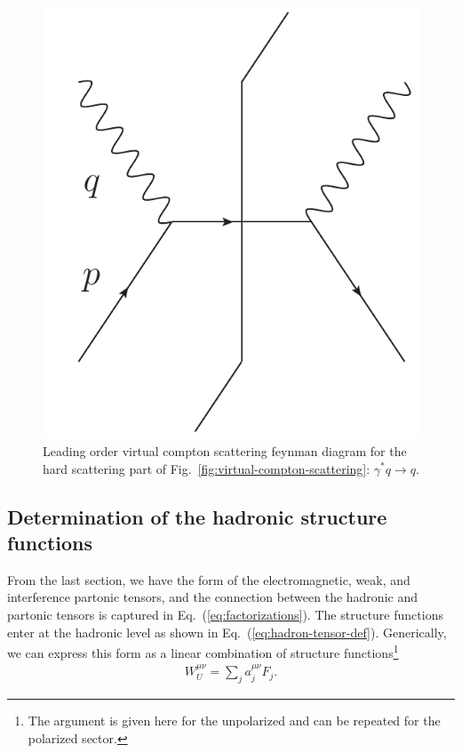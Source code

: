 \documentclass[aps,prd,amsmath,superscriptaddress,floatfix,nofootinbib]{revtex4-2}
\newcommand{\eref}[1]{Eq.~(\ref{eq:#1})}
\newcommand{\fref}[1]{Fig.~\ref{fig:#1}}
\begin{document}
\begin{figure}[h!tb]
\begin{center} 
    \includegraphics[width=0.2\paperwidth]{DIS_LO.pdf}
    \caption{Leading order virtual compton scattering feynman diagram for the hard scattering part of \fref{virtual-compton-scattering}: $\gamma^{*}q \rightarrow q$.}
    \label{fig:virtual-compton-scattering-LO}
\end{center}
\end{figure}


\subsection{Determination of the hadronic structure functions}
\label{ss:determination-of-the-hadronic-structure-functions}

From the last section, we have the form of the electromagnetic, weak, and interference partonic tensors, and the connection between the hadronic and partonic tensors is captured in \eref{factorizations}.
The structure functions enter at the hadronic level as shown in \eref{hadron-tensor-def}.
Generically, we can express this form as a linear combination of structure functions\footnote{The argument is given here for the unpolarized and can be repeated for the polarized sector.}
\begin{eqnarray}
    \label{eq:hadronic-tensor-generic}
    W^{\mu\nu}_{U} = \sum_{j} a_{j}^{\mu\nu} F_{j}
.\end{eqnarray}
\end{document}
